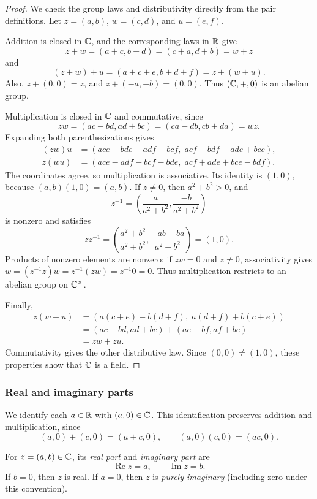 \documentclass[11pt,a4paper]{amsart}
\begin{document}
\begin{proof}
  We check the group laws and distributivity directly from the pair
  definitions. Let \(z=(a,b)\), \(w=(c,d)\), and \(u=(e,f)\).

  Addition is closed in \(\mathbb{C}\), and the corresponding laws in
  \(\mathbb{R}\) give
  \[
    z+w=(a+c,b+d)=(c+a,d+b)=w+z
  \]
  and
  \[
    (z+w)+u=(a+c+e,b+d+f)=z+(w+u).
  \]
  Also, \(z+(0,0)=z\), and
  \(z+(-a,-b)=(0,0)\). Thus \((\mathbb{C},+,0)\) is an abelian group.

  Multiplication is closed in \(\mathbb{C}\) and commutative, since
  \[
    zw=(ac-bd,ad+bc)=(ca-db,cb+da)=wz.
  \]
  Expanding both parenthesizations gives
  \begin{align*}
    (zw)u
    &=(ace-bde-adf-bcf,\;acf-bdf+ade+bce),\\
    z(wu)
    &=(ace-adf-bcf-bde,\;acf+ade+bce-bdf).
  \end{align*}
  The coordinates agree, so multiplication is associative.
  Its identity is \((1,0)\), because \((a,b)(1,0)=(a,b)\).
  If \(z\neq0\), then \(a^2+b^2>0\), and
  \[
    z^{-1}=\left(\frac{a}{a^2+b^2},\frac{-b}{a^2+b^2}\right)
  \]
  is nonzero and satisfies
  \[
    zz^{-1}
    =\left(\frac{a^2+b^2}{a^2+b^2},
    \frac{-ab+ba}{a^2+b^2}\right)=(1,0).
  \]
  Products of nonzero elements are nonzero: if \(zw=0\) and
  \(z\neq0\), associativity gives
  \(w=(z^{-1}z)w=z^{-1}(zw)=z^{-1}0=0\).
  Thus multiplication restricts to an abelian group on \(\mathbb{C}^{\times}\).

  Finally,
  \begin{align*}
    z(w+u)
    &=(a(c+e)-b(d+f),\;a(d+f)+b(c+e))\\
    &=(ac-bd,ad+bc)+(ae-bf,af+be)\\
    &=zw+zu.
  \end{align*}
  Commutativity gives the other distributive law. Since
  \((0,0)\neq(1,0)\), these properties show that \(\mathbb{C}\) is a field.
\end{proof}

\subsubsection{Real and imaginary parts}

We identify each \(a\in\mathbb{R}\) with \((a,0)\in\mathbb{C}\). This identification
preserves addition and multiplication, since
\[
  (a,0)+(c,0)=(a+c,0),\qquad (a,0)(c,0)=(ac,0).
\]

\begin{definition}
  For \(z=(a,b)\in\mathbb{C}\), its \emph{real part} and
  \emph{imaginary part} are
  \[
    \operatorname{Re}z=a,\qquad \operatorname{Im}z=b.
  \]
  If \(b=0\), then \(z\) is real. If \(a=0\), then \(z\) is
  \emph{purely imaginary} (including zero under this convention).
\end{definition}
\end{document}
